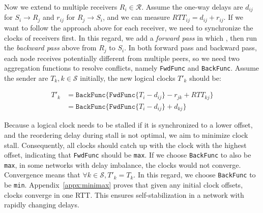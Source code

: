 Now we extend to multiple receivers $R_i \in \mathcal{R}$.
Assume the one-way delays are $d_{ij}$ for $S_i \rightarrow R_j$ and $r_{ij}$ for $R_j \rightarrow S_i$, and we can measure $RTT_{ij} = d_{ij} + r_{ij}$.
If we want to follow the approach above for each receiver, we need to synchronize the clocks of receivers first.
In this regard, we add a \textit{forward pass} in which , then run the \textit{backward pass} above from $R_j$ to $S_i$.
In both forward pass and backward pass, each node receives potentially different  from multiple peers, so we need two aggregation functions to resolve conflicts, namely \texttt{FwdFunc} and \texttt{BackFunc}.
Assume the sender  are $T_k, k \in \mathcal{S}$ initially, the new logical clocks $T'_k$ should be:

\vspace{-1em}
\begin{equation*}
\begin{aligned}
T'_k & = \texttt{BackFunc} \{ \texttt{FwdFunc} \{ T_i - d_{ij} \} - r_{jk} + RTT_{kj} \} \\
     & = \texttt{BackFunc} \{ \texttt{FwdFunc} \{ T_i - d_{ij} \} + d_{kj} \}
\end{aligned}
\end{equation*}

Because a logical clock needs to be stalled if it is synchronized to a lower offset, and the reordering delay during stall is not optimal, we aim to minimize clock stall.
Consequently, all clocks should catch up with the clock with the highest offset, indicating that \texttt{FwdFunc} should be \texttt{max}.
If we choose \texttt{BackFunc} to also be \texttt{max}, in some networks with delay imbalance, the clocks would not converge.
Convergence means that $\forall k \in \mathcal{S}, T'_k = T_k$.
In this regard, we choose \texttt{BackFunc} to be \texttt{min}.
Appendix~\ref{appx:minimax} proves that given any initial clock offsets, clocks converge in one RTT.
This ensures self-stabilization in a network with rapidly changing delays.


